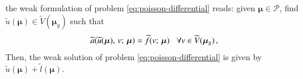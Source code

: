 \documentclass{elsarticle}
\numberwithin{equation}{section}
\theoremstyle{theorem}
\theoremstyle{definition}
\theoremstyle{remark}
\theoremstyle{proposition}
\numberwithin{figure}{section}
\newcommand{\wt}[1]{\widetilde{#1}}
\newcommand{\bg}[1]{\boldsymbol{#1}}
\begin{document}
		the weak formulation of problem \eqref{eq:poisson-differential} reads: given $\bg{\mu} \in \mathcal{P}$, find $\wt{u}(\bg{\mu}) \in \wt{V}(\bg{\mu}_g)$ such that
		\begin{equation}
			\label{eq:poisson-weak}
			\wt{a}(\wt{u}(\bg{\mu}), \, v; \, \bg{\mu}) = \wt{f}(v; \, \bg{\mu}) \hspace*{0.3cm} \forall v \in \wt{V}(\bg{\mu}_g) \, , 
		\end{equation}
		Then, the weak solution of problem \eqref{eq:poisson-differential} is given by $\wt{u}(\bg{\mu}) + \wt{l}(\bg{\mu})$. %
		
		
\end{document}
